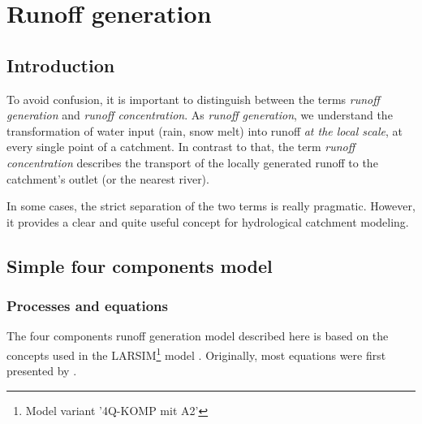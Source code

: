 \chapter{Runoff generation} \label{chap:runGen}
\renewcommand{\tabdir}{chapters/part_processes/runoffGeneration/tab}
\renewcommand{\figdir}{chapters/part_processes/runoffGeneration/fig}

\section{Introduction} \label{sec:runGen_intro}

To avoid confusion, it is important to distinguish between the terms \emph{runoff generation} and \emph{runoff concentration}. As \emph{runoff generation}, we understand the transformation of water input (rain, snow melt) into runoff \emph{at the local scale}, \ie{} at every single point of a catchment. In contrast to that, the term \emph{runoff concentration} describes the transport of the locally generated runoff to the catchment's outlet (or the nearest river).

In some cases, the strict separation of the two terms is really pragmatic. However, it provides a clear and quite useful concept for hydrological catchment modeling.







\section{Simple four components model} \label{sec:runGen4comp}


\subsection{Processes and equations} \label{sec:runGen4comp_processes}

The four components runoff generation model described here is based on the concepts used in the LARSIM\footnote{Model variant '4Q-KOMP mit A2'} model \citet{Ludwig2006}. Originally, most equations were first presented by \citet{Todini1996}.


